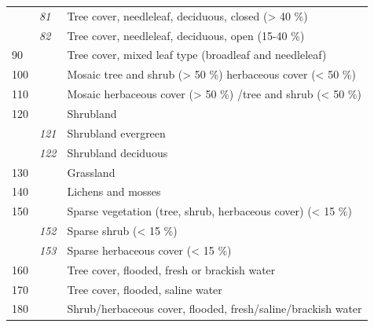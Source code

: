 \begin{table}[htbp]
\begin{tabular}{lll}
                             & \textit{81}          & Tree cover, needleleaf, deciduous, closed (> 40 \%)                 \\
                             & \textit{82}          & Tree cover, needleleaf, deciduous, open (15-40 \%)                  \\
    90                       &                      & Tree cover, mixed leaf type (broadleaf and needleleaf)              \\
    100                      &                      & Mosaic tree and shrub (> 50 \%) herbaceous cover (< 50 \%)          \\
    110                      &                      & Mosaic herbaceous cover (> 50 \%) /tree and shrub (< 50 \%)         \\
    120                      &                      & Shrubland                                                           \\
                             & \textit{121}         & Shrubland evergreen                                                 \\
                             & \textit{122}         & Shrubland deciduous                                                 \\
    130                      &                      & Grassland                                                           \\
    140                      &                      & Lichens and mosses                                                  \\
    150                      &                      & Sparse vegetation (tree, shrub, herbaceous cover) (< 15 \%)         \\
                             & \textit{152}         & Sparse shrub (< 15 \%)                                              \\
                             & \textit{153}         & Sparse herbaceous cover (< 15 \%)                                   \\
    160                      &                      & Tree cover, flooded, fresh or brackish water                        \\
    170                      &                      & Tree cover, flooded, saline water                                   \\
    180                      &                      & Shrub/herbaceous cover, flooded, fresh/saline/brackish water        \\

\end{tabular}
\end{table}
